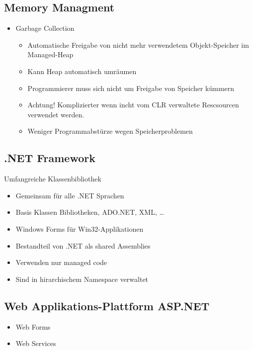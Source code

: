 \subsection{Memory Managment}
\begin{itemize}
	\item Garbage Collection
		\begin{itemize}
			\item Automatische Freigabe von nicht mehr verwendetem Objekt-Speicher im Managed-Heap
			\item Kann Heap automatisch umräumen
			\item Programmierer muss sich nicht um Freigabe von Speicher kümmern
			\item Achtung! Komplizierter wenn incht vom CLR verwaltete Rescsourcen verwendet werden.
			\item Weniger Programmabstürze wegen Speicherproblemen
		\end{itemize}
\end{itemize}

\subsection{.NET Framework}
Umfangreiche Klassenbibliothek
\begin{itemize}
	\item Gemeinsam für alle .NET Sprachen
	\item Basis Klassen Bibliotheken, ADO.NET, XML, \dots
	\item Windows Forms für Win32-Applikationen
	\item Bestandteil von .NET als shared Assemblies
	\item Verwenden nur managed code
	\item Sind in hirarchischem Namespace verwaltet
\end{itemize}

\subsection{Web Applikations-Plattform ASP.NET}
\begin{itemize}
	\item Web Forms
	\item Web Services
\end{itemize}
